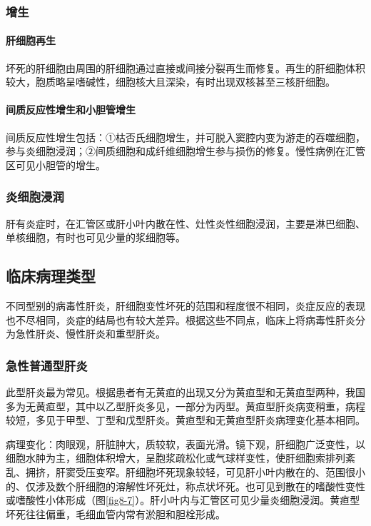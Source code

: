 \subsubsection{增生}

\paragraph{肝细胞再生}
坏死的肝细胞由周围的肝细胞通过直接或间接分裂再生而修复。再生的肝细胞体积较大，胞质略呈嗜碱性，细胞核大且深染，有时出现双核甚至三核肝细胞。

\paragraph{间质反应性增生和小胆管增生}
间质反应性增生包括：①枯否氏细胞增生，并可脱入窦腔内变为游走的吞噬细胞，参与炎细胞浸润；②间质细胞和成纤维细胞增生参与损伤的修复。慢性病例在汇管区可见小胆管的增生。

\subsubsection{炎细胞浸润}

肝有炎症时，在汇管区或肝小叶内散在性、灶性炎性细胞浸润，主要是淋巴细胞、单核细胞，有时也可见少量的浆细胞等。

\subsection{临床病理类型}

不同型别的病毒性肝炎，肝细胞变性坏死的范围和程度很不相同，炎症反应的表现也不尽相同，炎症的结局也有较大差异。根据这些不同点，临床上将病毒性肝炎分为急性肝炎、慢性肝炎和重型肝炎。

\subsubsection{急性普通型肝炎}

此型肝炎最为常见。根据患者有无黄疸的出现又分为黄疸型和无黄疸型两种，我国多为无黄疸型，其中以乙型肝炎多见，一部分为丙型。黄疸型肝炎病变稍重，病程较短，多见于甲型、丁型和戊型肝炎。黄疸型和无黄疸型肝炎病理变化基本相同。

病理变化：肉眼观，肝脏肿大，质较软，表面光滑。镜下观，肝细胞广泛变性，以细胞水肿为主，细胞体积增大，呈胞浆疏松化或气球样变性，使肝细胞索排列紊乱、拥挤，肝窦受压变窄。肝细胞坏死现象较轻，可见肝小叶内散在的、范围很小的、仅涉及数个肝细胞的溶解性坏死灶，称点状坏死。也可见到散在的嗜酸性变性或嗜酸性小体形成（图\ref{fig8-7}）。肝小叶内与汇管区可见少量炎细胞浸润。黄疸型坏死往往偏重，毛细血管内常有淤胆和胆栓形成。

